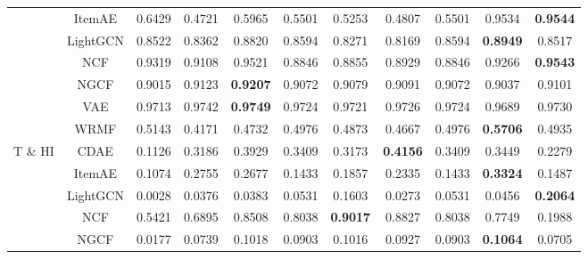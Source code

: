 \begin{table}[t]
{\begin{tabular}{c|c|ccccccccc}
		                            & ItemAE                     & 0.6429 & 0.4721          & 0.5965          & 0.5501 & 0.5253          & 0.4807          & 0.5501          & 0.9534          & \textbf{0.9544} \\
		                            & LightGCN                   & 0.8522 & 0.8362          & 0.8820          & 0.8594 & 0.8271          & 0.8169          & 0.8594          & \textbf{0.8949} & 0.8517          \\
		                            & NCF                        & 0.9319 & 0.9108          & 0.9521          & 0.8846 & 0.8855          & 0.8929          & 0.8846          & 0.9266          & \textbf{0.9543} \\
		                            & NGCF                       & 0.9015 & 0.9123          & \textbf{0.9207} & 0.9072 & 0.9079          & 0.9091          & 0.9072          & 0.9037          & 0.9101          \\
		                            & VAE                        & 0.9713 & 0.9742          & \textbf{0.9749} & 0.9724 & 0.9721          & 0.9726          & 0.9724          & 0.9689          & 0.9730          \\
		                            & WRMF                       & 0.5143 & 0.4171          & 0.4732          & 0.4976 & 0.4873          & 0.4667          & 0.4976          & \textbf{0.5706} & 0.4935          \\ \hline
		\multirow{7}{*}{T \& HI}    & CDAE                       & 0.1126 & 0.3186          & 0.3929          & 0.3409 & 0.3173          & \textbf{0.4156} & 0.3409          & 0.3449          & 0.2279          \\
		                            & ItemAE                     & 0.1074 & 0.2755          & 0.2677          & 0.1433 & 0.1857          & 0.2335          & 0.1433          & \textbf{0.3324} & 0.1487          \\
		                            & LightGCN                   & 0.0028 & 0.0376          & 0.0383          & 0.0531 & 0.1603          & 0.0273          & 0.0531          & 0.0456          & \textbf{0.2064} \\
		                            & NCF                        & 0.5421 & 0.6895          & 0.8508          & 0.8038 & \textbf{0.9017} & 0.8827          & 0.8038          & 0.7749          & 0.1988          \\
		                            & NGCF                       & 0.0177 & 0.0739          & 0.1018          & 0.0903 & 0.1016          & 0.0927          & 0.0903          & \textbf{0.1064} & 0.0705          \\

\end{tabular}}
\end{table}
